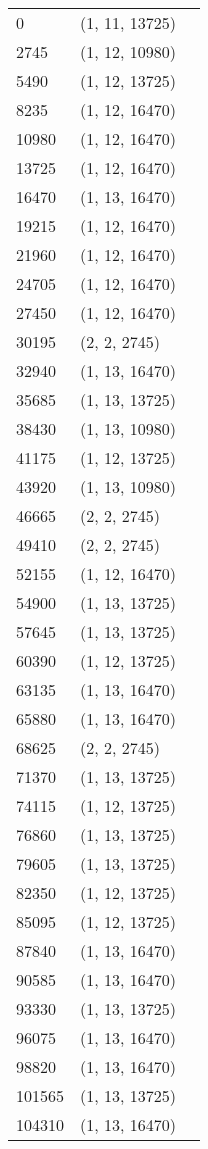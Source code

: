 \begin{longtable}{|l|l|l|}
		0 & (1, 11, 13725)\\
		2745 & (1, 12, 10980) \\
		5490 & (1, 12, 13725) \\
		8235 & (1, 12, 16470) \\
		10980 & (1, 12, 16470) \\
		13725 & (1, 12, 16470) \\
		16470 & (1, 13, 16470) \\
		19215 & (1, 12, 16470) \\
		21960 & (1, 12, 16470) \\
		24705 & (1, 12, 16470) \\
		27450 & (1, 12, 16470) \\
		30195 & (2, 2, 2745) \\
		32940 & (1, 13, 16470) \\
		35685 & (1, 13, 13725) \\
		38430 & (1, 13, 10980) \\
		41175 & (1, 12, 13725) \\
		43920 & (1, 13, 10980) \\
		46665 & (2, 2, 2745) \\
		49410 & (2, 2, 2745) \\
		52155 & (1, 12, 16470) \\
		54900 & (1, 13, 13725) \\
		57645 & (1, 13, 13725) \\
		60390 & (1, 12, 13725) \\
		63135 & (1, 13, 16470) \\
		65880 & (1, 13, 16470)\\
		68625 & (2, 2, 2745) \\
		71370 & (1, 13, 13725) \\
		74115 & (1, 12, 13725) \\
		76860 & (1, 13, 13725) \\
		79605 & (1, 13, 13725) \\
		82350 & (1, 12, 13725) \\
		85095 & (1, 12, 13725) \\
		87840 & (1, 13, 16470) \\
		90585 & (1, 13, 16470) \\
		93330 & (1, 13, 13725) \\
		96075 & (1, 13, 16470) \\
		98820 & (1, 13, 16470) \\
		101565 & (1, 13, 13725) \\
		104310 & (1, 13, 16470) \\

\end{longtable}
